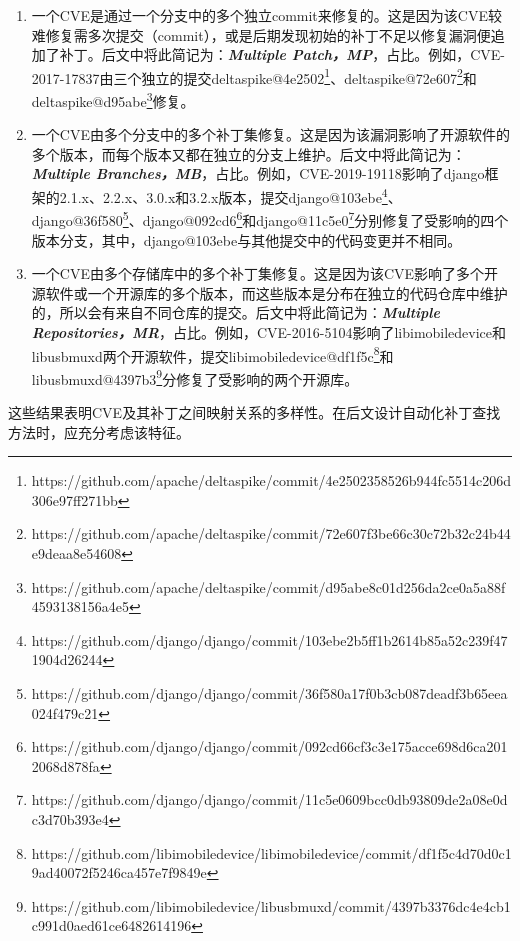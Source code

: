 \begin{enumerate}
\item [（1）] 一个CVE是通过一个分支中的多个独立commit来修复的。这是因为该CVE较难修复需多次提交（commit），或是后期发现初始的补丁不足以修复漏洞便追加了补丁。后文中将此简记为：\textbf{\textit{Multiple Patch，MP}}，占比。例如，CVE-2017-17837由三个独立的提交deltaspike@4e2502\footnote{https://github.com/apache/deltaspike/commit/4e2502358526b944fc5514c206d306e97ff271bb}、deltaspike@72e607\footnote{https://github.com/apache/deltaspike/commit/72e607f3be66c30c72b32c24b44e9deaa8e54608}和\\deltaspike@d95abe\footnote{https://github.com/apache/deltaspike/commit/d95abe8c01d256da2ce0a5a88f4593138156a4e5}修复。
\item  [（2）]一个CVE由多个分支中的多个补丁集修复。这是因为该漏洞影响了开源软件的多个版本，而每个版本又都在独立的分支上维护。后文中将此简记为：\textbf{\textit{Multiple Branches，MB}}，占比。例如，CVE-2019-19118影响了django框架的2.1.x、2.2.x、3.0.x和3.2.x版本，提交django@103ebe\footnote{https://github.com/django/django/commit/103ebe2b5ff1b2614b85a52c239f471904d26244}、django@36f580\footnote{https://github.com/django/django/commit/36f580a17f0b3cb087deadf3b65eea024f479c21}、django@092cd6\footnote{https://github.com/django/django/commit/092cd66cf3c3e175acce698d6ca2012068d878fa}和django@11c5e0\footnote{https://github.com/django/django/commit/11c5e0609bcc0db93809de2a08e0dc3d70b393e4}分别修复了受影响的四个版本分支，其中，django@103ebe与其他提交中的代码变更并不相同。
\item  [（3）]一个CVE由多个存储库中的多个补丁集修复。这是因为该CVE影响了多个开源软件或一个开源库的多个版本，而这些版本是分布在独立的代码仓库中维护的，所以会有来自不同仓库的提交。后文中将此简记为：\textbf{\textit{Multiple Repositories，MR}}，占比。例如，CVE-2016-5104影响了libimobiledevice和libusbmuxd两个开源软件，提交libimobiledevice@df1f5c\footnote{https://github.com/libimobiledevice/libimobiledevice/commit/df1f5c4d70d0c19ad40072f5246ca457e7f9849e}和libusbmuxd@4397b3\footnote{https://github.com/libimobiledevice/libusbmuxd/commit/4397b3376dc4e4cb1c991d0aed61ce6482614196}分修复了受影响的两个开源库。

\end{enumerate}

这些结果表明CVE及其补丁之间映射关系的多样性。在后文设计自动化补丁查找方法时，应充分考虑该特征。

